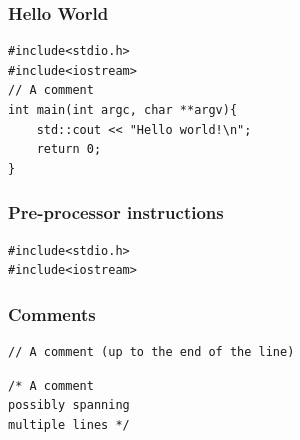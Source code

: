 
\begin{frame}[fragile]
\frametitle{Hello World}
\begin{lstlisting}
#include<stdio.h>
#include<iostream>
// A comment
int main(int argc, char **argv){
    std::cout << "Hello world!\n";
    return 0;
}
\end{lstlisting}
\end{frame}


\begin{frame}[fragile]
\frametitle{Pre-processor instructions}
\begin{lstlisting}
#include<stdio.h>
#include<iostream>
\end{lstlisting}
\end{frame}


\begin{frame}[fragile]
\frametitle{Comments}
\begin{lstlisting}[firstnumber=3]
// A comment (up to the end of the line)
\end{lstlisting}
\begin{lstlisting}[firstnumber=3]
/* A comment 
possibly spanning
multiple lines */
\end{lstlisting}
\end{frame}

